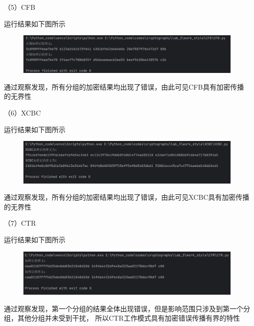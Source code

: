 \documentclass[a4paper,11pt,UTF8]{ctexart}
\newcommand{\bottomcaption}{%
\setlength{\abovecaptionskip}{6pt}%
\setlength{\belowcaptionskip}{6pt}%
\caption}
\newcommand{\xiaowuhao}{\fontsize{9pt}{\baselineskip}\selectfont}   %
\begin{document}
            （5）CFB\par
                运行结果如下图所示
                \begin{figure}[H]
                    \centering
                    \includegraphics[width=13cm]{CFB_result_2.png}
                    \bottomcaption{\xiaowuhao{CFB修改一位明文两次加密结果}}
                \end{figure}
                通过观察发现，所有分组的加密结果均出现了错误，由此可见CFB具有加密传播的无界性\par
\newpage
            （6）XCBC\par
                运行结果如下图所示
                \begin{figure}[H]
                    \centering
                    \includegraphics[width=13cm]{XCBC_result_2.png}
                    \bottomcaption{\xiaowuhao{XCBC修改一位明文两次加密结果}}
                \end{figure}
                通过观察发现，所有分组的加密结果均出现了错误，由此可见XCBC具有加密传播的无界性\par

            （7）CTR\par
                运行结果如下图所示
                \begin{figure}[H]
                    \centering
                    \includegraphics[width=13cm]{CTR_result_2.png}
                    \bottomcaption{\xiaowuhao{CTR修改一位明文两次加密结果}}
                \end{figure}
                通过观察发现，第一个分组的结果全体出现错误，但是影响范围只涉及到第一个分组，其他分组并未受到干扰，
                所以CTR工作模式具有加密错误传播有界的特性\par
\newpage                
\end{document}
